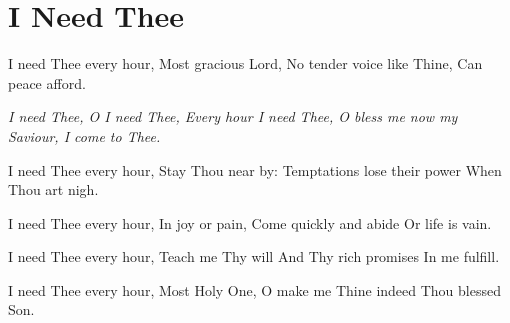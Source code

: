\starttocol
\chapter{I Need Thee}
\nexttocol
\hfill{\it }
\stoptocol
\starttocol
\startlines
{\sc I need} Thee every hour, 
Most gracious Lord, 
No tender voice like Thine, 
Can peace afford.  

{\it I need Thee, O I need Thee, 
Every hour I need Thee, 
O bless me now my Saviour, 
I come to Thee.}

I need Thee every hour, 
Stay Thou near by: 
Temptations lose their power 
When Thou art nigh.

I need Thee every hour, 
In joy or pain, 
Come quickly and abide 
Or life is vain.

I need Thee every hour, 
Teach me Thy will 
And Thy rich promises
In me fulfill.

I need Thee every hour, 
Most Holy One, 
O make me Thine indeed
Thou blessed Son.
\stoplines
\nexttocol

\stoptocol
